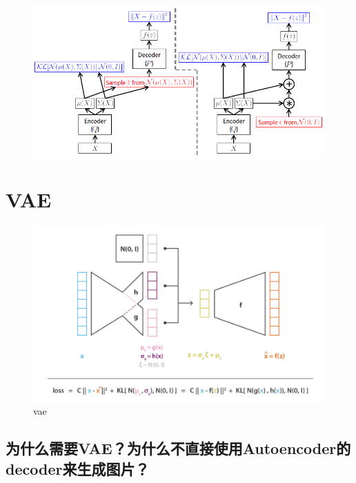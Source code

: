 \begin{figure}[H]
    \centering
    \includegraphics[width=12cm]{images/vae_reparameterization_trick.png}
    \label{fig:vae_reparameterization_trick}
\end{figure}

\section{VAE}
\begin{figure}[H]
    \centering
    \includegraphics[width=12cm]{images/vae.png}
    \caption{vae}
    \label{fig:VAE}
\end{figure}
\subsection{为什么需要VAE？为什么不直接使用Autoencoder的decoder来生成图片？}

